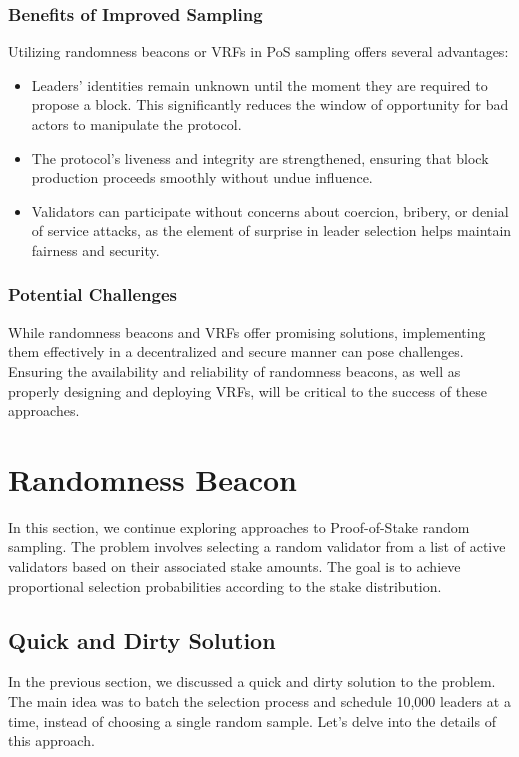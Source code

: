 \subsubsection{Benefits of Improved Sampling}
Utilizing randomness beacons or VRFs in PoS sampling offers several advantages:
\begin{itemize}
\item Leaders' identities remain unknown until the moment they are required to propose a block. This significantly reduces the window of opportunity for bad actors to manipulate the protocol.
\item The protocol's liveness and integrity are strengthened, ensuring that block production proceeds smoothly without undue influence.
\item Validators can participate without concerns about coercion, bribery, or denial of service attacks, as the element of surprise in leader selection helps maintain fairness and security.
\end{itemize}

\subsubsection{Potential Challenges}
While randomness beacons and VRFs offer promising solutions, implementing them effectively in a decentralized and secure manner can pose challenges. Ensuring the availability and reliability of randomness beacons, as well as properly designing and deploying VRFs, will be critical to the success of these approaches.


\section{Randomness Beacon}
In this section, we continue exploring approaches to Proof-of-Stake random sampling. The problem involves selecting a random validator from a list of active validators based on their associated stake amounts. The goal is to achieve proportional selection probabilities according to the stake distribution.

\subsection{Quick and Dirty Solution}
In the previous section, we discussed a quick and dirty solution to the problem. The main idea was to batch the selection process and schedule 10,000 leaders at a time, instead of choosing a single random sample. Let's delve into the details of this approach.

